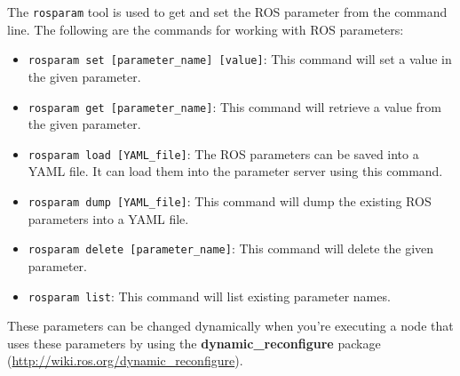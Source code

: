 \documentclass[../../main]{subfiles}
\begin{document}
The \texttt{rosparam} tool is used to get and set the ROS parameter from the command line. The following are the commands for working with ROS parameters:
\begin{itemize}
    \item \texttt{rosparam set [parameter\_name] [value]}: This command will set a value in the given parameter.
    \item \texttt{rosparam get [parameter\_name]}: This command will retrieve a value from the given parameter.
    \item \texttt{rosparam load [YAML\_file]}: The ROS parameters can be saved into a YAML file. It can load them into the parameter server using this command.
    \item \texttt{rosparam dump [YAML\_file]}: This command will dump the existing ROS parameters into a YAML file.
    \item \texttt{rosparam delete [parameter\_name]}: This command will delete the given parameter.
    \item \texttt{rosparam list}: This command will list existing parameter names.
\end{itemize}
These parameters can be changed dynamically when you're executing a node that uses these parameters by using the \textbf{dynamic\_reconfigure} package (\url{http://wiki.ros.org/dynamic_reconfigure}).

\newpage
\end{document}
